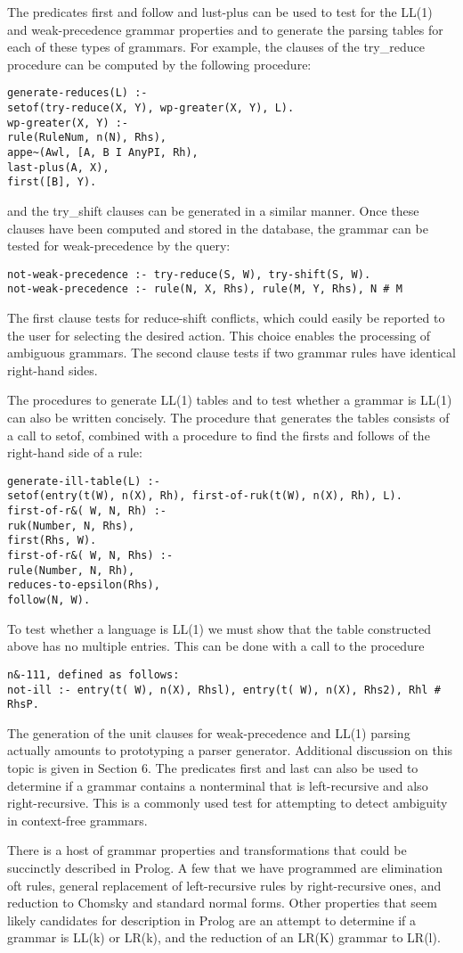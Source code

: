 The predicates first and follow and lust-plus can be used to test for the LL(1)
and weak-precedence grammar properties and to generate the parsing tables for
each of these types of grammars. For example, the clauses of the try\_reduce
procedure can be computed by the following procedure:
\begin{verbatim}
generate-reduces(L) :-
setof(try-reduce(X, Y), wp-greater(X, Y), L).
wp-greater(X, Y) :-
rule(RuleNum, n(N), Rhs),
appe~(Awl, [A, B I AnyPI, Rh),
last-plus(A, X),
first([B], Y). 
\end{verbatim}
and the try\_shift clauses can be generated in a similar manner. Once these
clauses have been computed and stored in the database, the grammar can be tested for
weak-precedence by the query:
\begin{verbatim}
not-weak-precedence :- try-reduce(S, W), try-shift(S, W).
not-weak-precedence :- rule(N, X, Rhs), rule(M, Y, Rhs), N # M 
\end{verbatim}
The first clause tests for reduce-shift conflicts, which could easily be reported to
the user for selecting the desired action. This choice enables the processing of
ambiguous grammars. The second clause tests if two grammar rules have identical
right-hand sides. 

The procedures to generate LL(1) tables and to test whether a grammar is
LL(1) can also be written concisely. The procedure that generates the tables
consists of a call to setof, combined with a procedure to find the firsts and follows
of the right-hand side of a rule:
\begin{verbatim}
generate-ill-table(L) :-
setof(entry(t(W), n(X), Rh), first-of-ruk(t(W), n(X), Rh), L).
first-of-r&( W, N, Rh) :-
ruk(Number, N, Rhs),
first(Rhs, W).
first-of-r&( W, N, Rhs) :-
rule(Number, N, Rh),
reduces-to-epsilon(Rhs),
follow(N, W). 
\end{verbatim}
To test whether a language is LL(1) we must show that the table constructed
above has no multiple entries. This can be done with a call to the procedure
\begin{verbatim}
n&-111, defined as follows:
not-ill :- entry(t( W), n(X), Rhsl), entry(t( W), n(X), Rhs2), Rhl # RhsP.
\end{verbatim}

The generation of the unit clauses for weak-precedence and LL(1) parsing
actually amounts to prototyping a parser generator. Additional discussion on this
topic is given in Section 6. The predicates first and last can also be used to
determine if a grammar contains a nonterminal that is left-recursive and also
right-recursive. This is a commonly used test for attempting to detect ambiguity
in context-free grammars. 

There is a host of grammar properties and transformations that could be
succinctly described in Prolog. A few that we have programmed are elimination
oft rules, general replacement of left-recursive rules by right-recursive ones, and
reduction to Chomsky and standard normal forms. Other properties that seem
likely candidates for description in Prolog are an attempt to determine if a
grammar is LL(k) or LR(k), and the reduction of an LR(K) grammar to LR(l). 
 
 
\secup